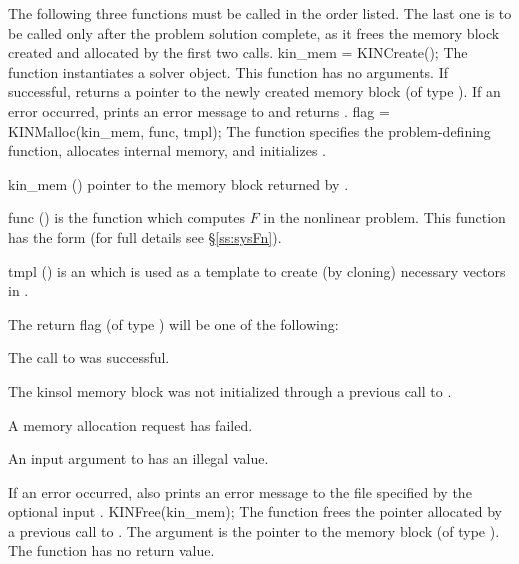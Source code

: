The following three functions must be called in the order listed. The last one
is to be called only after the problem solution complete, as it frees the
{\kinsol} memory block created and allocated by the first two calls.
{
  kin\_mem = KINCreate();
}
{
  The function  instantiates a {\kinsol} solver object.
}
{
  This function has no arguments.
}
{
  If successful,  returns a pointer to the newly created 
  {\kinsol} memory block (of type ).
  If an error occurred,  prints an error message to 
  and returns .
}
{}
{
flag = KINMalloc(kin\_mem, func, tmpl);
}
{
  The function  specifies the problem-defining
  function, allocates internal memory, and initializes {\kinsol}.
}
{
  \begin{args}
  \item[kin\_mem] ()
    pointer to the {\kinsol} memory block returned by .
  \item[func] ()
    is the {\C} function which computes $F$ in the nonlinear problem. 
    This function has the form  
    (for full details see \S\ref{ss:sysFn}).
  \item[tmpl] ()
    is an  which is used as a template to create (by cloning)
    necessary vectors in .
  \end{args}
}
{
  The return flag  (of type ) will be one of the following:
  \begin{args}
  \item[\Id{KIN\_SUCCESS}]
    The call to  was successful.
  \item[\Id{KIN\_MEM\_NULL}] 
    The {kinsol} memory block was not initialized through a previous call
    to .
  \item[\Id{KIN\_MEM\_FAIL}] 
    A memory allocation request has failed.
  \item[\Id{KIN\_ILL\_INPUT}] 
    An input argument to  has an illegal value.
  \end{args}
}
{
  If an error occurred,  also prints an error message to the
  file specified by the optional input .
}
{
  KINFree(kin\_mem);
}
{
  The function  frees the pointer allocated by
  a previous call to .
}
{
  The argument is the pointer to the {\kinsol} memory block (of type ).
}
{
  The function  has no return value.
}
{}

